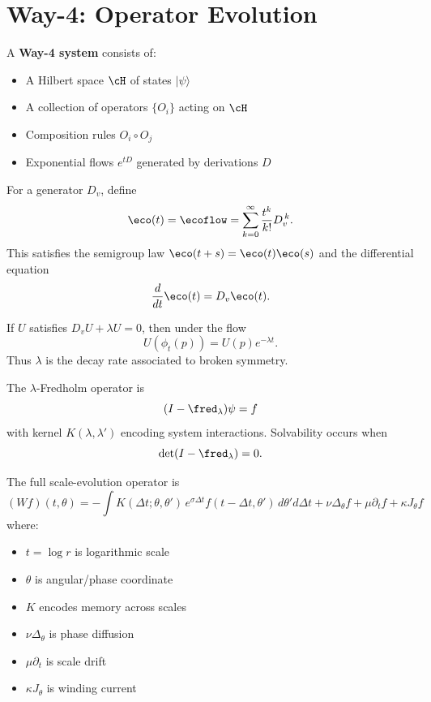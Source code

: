\section{Way-4: Operator Evolution}

\begin{definition}
A \textbf{Way-4 system} consists of:
\begin{itemize}
    \item A Hilbert space $\cH$ of states $\mid \psi\rangle$
    \item A collection of operators $\{O_i\}$ acting on $\cH$
    \item Composition rules $O_i \circ O_j$
    \item Exponential flows $e^{tD}$ generated by derivations $D$
\end{itemize}
\end{definition}

\begin{definition}
For a generator $D_v$, define
\[
\eco(t) = \ecoflow = \sum_{k=0}^{\infty} \frac{t^k}{k!} D_v^{\,k}.
\]
This satisfies the semigroup law $\eco(t+s) = \eco(t)\eco(s)$ and the differential equation
\[
\frac{d}{dt}\eco(t) = D_v\eco(t).
\]
\end{definition}

\begin{theorem}
If $U$ satisfies $D_v U + \lambda U = 0$, then under the flow
\[
U(\phi_t(p)) = U(p)e^{-\lambda t}.
\]
Thus $\lambda$ is the decay rate associated to broken symmetry.
\end{theorem}

\begin{definition}
The $\lambda$-Fredholm operator is
\[
(I - \fred_{\lambda})\psi = f
\]
with kernel $K(\lambda,\lambda')$ encoding system interactions. Solvability occurs when
\[
\det(I - \fred_{\lambda}) = 0.
\]
\end{definition}

\begin{definition}
The full scale-evolution operator is
\[
(Wf)(t,\theta) = -\int K(\Delta t;\theta,\theta')\, e^{\sigma\Delta t} f(t-\Delta t,\theta')\, d\theta' d\Delta t
+ \nu\Delta_{\theta}f + \mu\partial_t f + \kappa J_{\theta}f
\]
where:
\begin{itemize}
    \item $t = \log r$ is logarithmic scale
    \item $\theta$ is angular/phase coordinate
    \item $K$ encodes memory across scales
    \item $\nu\Delta_{\theta}$ is phase diffusion
    \item $\mu\partial_t$ is scale drift
    \item $\kappa J_{\theta}$ is winding current
\end{itemize}
\end{definition}

